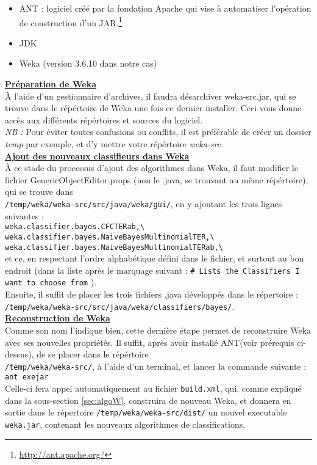 \documentclass{article}
\begin{document}
\begin{itemize}
\item ANT : logiciel créé par la fondation Apache qui vise à automatiser l'opération de construction d'un JAR.\footnote{\href{http://ant.apache.org/}{http://ant.apache.org/}}
\item JDK
\item Weka (version 3.6.10 dans notre cas)
\end{itemize}
\textbf{\underline{Préparation de Weka}}\\
À l'aide d'un gestionnaire d'archives, il faudra désarchiver weka-src.jar, qui se trouve dans le répértoire de Weka une fois ce dernier installer. Ceci vous donne accès aux différents répértoires et sources du logiciel.\\
\textit{NB :} Pour éviter toutes confusions ou conflits, il est préférable de créer un dossier \textit{temp} par exemple, et d'y mettre votre répértoire \textit{weka-src}.\\
\textbf{\underline{Ajout des nouveaux classifieurs dans Weka}}\\
À ce stade du processus d'ajout des algorithmes dans Weka, il faut modifier le fichier GenericObjectEditor.props (non le .java, se trouvant au même répértoire), qui se trouve dans \\
 \texttt{/temp/weka/weka-src/src/java/weka/gui/}, en y ajoutant les trois lignes suivantes : \\
 \texttt{weka.classifier.bayes.CFCTERab,\textbackslash}\\
 \texttt{weka.classifier.bayes.NaiveBayesMultinomialTER,\textbackslash}\\
 \texttt{weka.classifier.bayes.NaiveBayesMultinomialTERab,\textbackslash}\\
 et ce, en respectant l'ordre alphabétique défini dans le fichier, et surtout au bon endroit (dans la liste après le marquage suivant :  \texttt{\# Lists the Classifiers I want to choose from} ).\\
Ensuite, il suffit de placer les trois fichiers .java développés dans le répertoire :\\
 \texttt{/temp/weka/weka-src/src/java/weka/classifiers/bayes/}.\\
 \textbf{\underline{Reconstruction de Weka}}\\
 Comme son nom l'indique bien, cette dernière étape permet de reconstruire Weka avec ses nouvelles propriétés. Il suffit, après avoir installé ANT(voir prérequis ci-dessus), de se placer dans le répértoire \\
  \texttt{/temp/weka/weka-src/}, à l'aide d'un terminal, et lancer la commande suivante : \\
\texttt{ant exejar}\\
Celle-ci fera appel automatiquement au fichier \texttt{build.xml}, qui, comme expliqué dans la sous-section \ref{sec:algoW}, construira de nouveau Weka, et donnera en sortie dans le répertoire \texttt{/temp/weka/weka-src/dist/} un nouvel executable \texttt{weka.jar}, contenant les nouveaux algorithmes de classifications.
\end{document}
